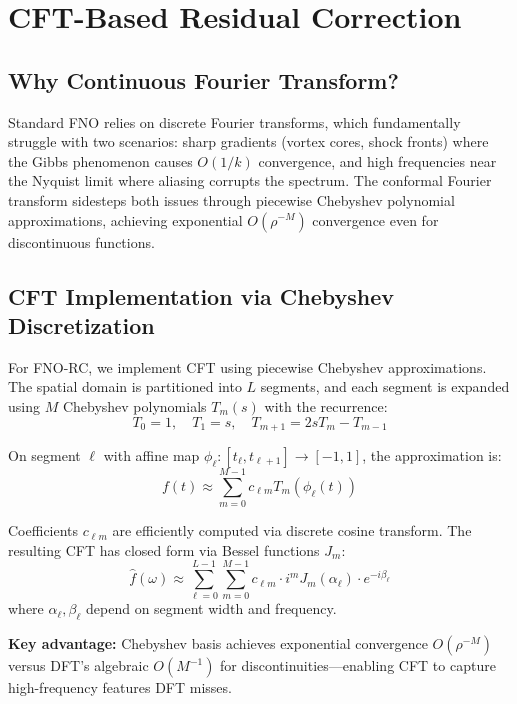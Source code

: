 \documentclass[11pt]{article}
\begin{document}
\section{CFT-Based Residual Correction}

\subsection{Why Continuous Fourier Transform?}

Standard FNO relies on discrete Fourier transforms, which fundamentally struggle with two scenarios: sharp gradients (vortex cores, shock fronts) where the Gibbs phenomenon causes $O(1/k)$ convergence, and high frequencies near the Nyquist limit where aliasing corrupts the spectrum. The conformal Fourier transform \citep{barnett2010conformal} sidesteps both issues through piecewise Chebyshev polynomial approximations, achieving exponential $O(\rho^{-M})$ convergence even for discontinuous functions.

\subsection{CFT Implementation via Chebyshev Discretization}

For FNO-RC, we implement CFT using piecewise Chebyshev approximations. The spatial domain is partitioned into $L$ segments, and each segment is expanded using $M$ Chebyshev polynomials $T_m(s)$ with the recurrence:
\begin{equation}
T_0=1, \quad T_1=s, \quad T_{m+1} = 2sT_m - T_{m-1}
\end{equation}

On segment $\ell$ with affine map $\phi_\ell: [t_\ell, t_{\ell+1}] \to [-1,1]$, the approximation is:
\begin{equation}
f(t) \approx \sum_{m=0}^{M-1} c_{\ell m} T_m(\phi_\ell(t))
\end{equation}

Coefficients $c_{\ell m}$ are efficiently computed via discrete cosine transform. The resulting CFT has closed form via Bessel functions $J_m$:
\begin{equation}
\hat{f}(\omega) \approx \sum_{\ell=0}^{L-1} \sum_{m=0}^{M-1} c_{\ell m} \cdot i^m J_m(\alpha_\ell) \cdot e^{-i\beta_\ell}
\end{equation}
where $\alpha_\ell, \beta_\ell$ depend on segment width and frequency.

\textbf{Key advantage:} Chebyshev basis achieves exponential convergence $O(\rho^{-M})$ versus DFT's algebraic $O(M^{-1})$ for discontinuities—enabling CFT to capture high-frequency features DFT misses.
\end{document}
